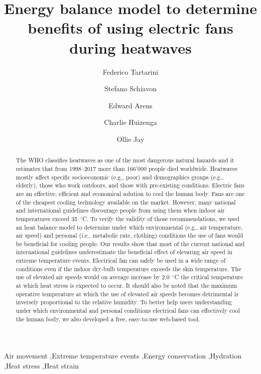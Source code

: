
\begin{frontmatter}

\title{Energy balance model to determine benefits of using electric fans during heatwaves}

\author[sinBerBest]{Federico Tartarini}
\author[CBE]{Stefano Schiavon}
\author[CBE]{Edward Arens}
\author[CBE]{Charlie Huizenga}
\author[USYD]{Ollie Jay}


\address[sinBerBest]{SinBerBEST, Berkeley Education Alliance for Research in Singapore, Singapore}
\address[CBE]{Center for the Built Environment, University of California, Berkeley, USA}
\address[USYD]{Sydney School ofHealth Sciences, Faculty ofMedicine and Health, The University ofSydney, Sydney, Australia}

\begin{abstract}
    The WHO classifies heatwaves as one of the most dangerous natural hazards and it estimates that from 1998--2017 more than 166'000 people died worldwide.
    Heatwaves mostly affect specific socioeconomic (e.g., poor) and demographics groups (e.g., elderly), those who work outdoors, and those with pre-existing conditions.
    Electric fans are an effective, efficient and economical solution to cool the human body.
    Fans are one of the cheapest cooling technology available on the market.
    However, many national and international guidelines discourage people from using them when indoor air temperatures exceed 35~$^{\circ}$C\@.
    To verify the validity of those recommendations, we used an heat balance model to determine under which environmental (e.g., air temperature, air speed) and personal (i.e., metabolic rate, clothing) conditions the use of fans would be beneficial for cooling people.
    Our results show that most of the current national and international guidelines underestimate the beneficial effect of elevating air speed in extreme temperature events.
    Electrical fan can safely be used in a wide range of conditions even if the indoor dry-bulb temperature exceeds the skin temperature.
    The use of elevated air speeds would on average increase by 2.0~$^{\circ}$C the critical temperature at which heat stress is expected to occur.
    It should also be noted that the maximum operative temperature at which the use of elevated air speeds becomes detrimental is inversely proportional to the relative humidity.
    To better help users understanding under which environmental and personal conditions electrical fans can effectively cool the human body, we also developed a free, easy-to-use web-based tool.
\end{abstract}

\begin{keyword}
Air movement \sep Extreme temperature events \sep Energy conservation \sep Hydration \sep Heat stress \sep Heat strain
\end{keyword}

\end{frontmatter}

